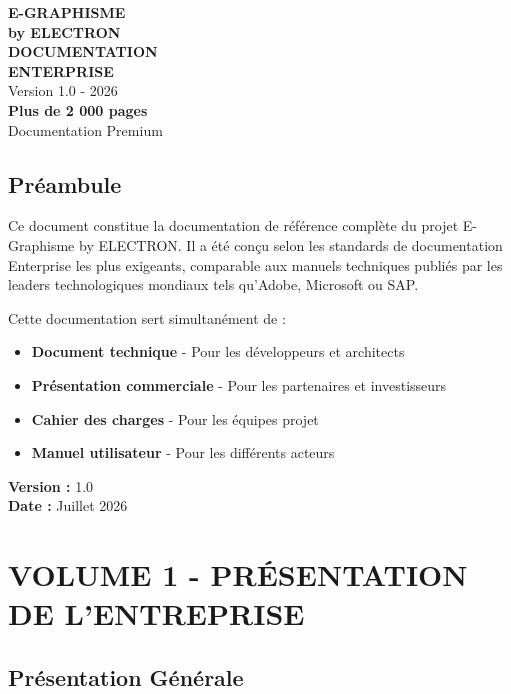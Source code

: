 \documentclass[12pt,a4paper,oneside]{book}
\begin{document}
\begin{titlepage}
\begin{center}
\vspace*{3cm}
{\Huge\bfseries\color{electronblue}E-GRAPHISME}\\[0.5cm]
{\LARGE\bfseries\color{electronpurple}by ELECTRON}\\[2cm]
{\Huge\bfseries\color{darkbg}DOCUMENTATION}\\[0.5cm]
{\Huge\bfseries\color{darkbg}ENTERPRISE}\\[3cm]
{\Large\color{electroncyan}Version 1.0 - 2026}\\[1cm]
\vfill
{\Large\bfseries\color{electrongold}Plus de 2 000 pages}\\[0.5cm]
{\Large Documentation Premium}
\end{center}
\end{titlepage}

\frontmatter
\chapter*{Préambule}
Ce document constitue la documentation de référence complète du projet E-Graphisme by ELECTRON. Il a été conçu selon les standards de documentation Enterprise les plus exigeants, comparable aux manuels techniques publiés par les leaders technologiques mondiaux tels qu'Adobe, Microsoft ou SAP.

Cette documentation sert simultanément de :
\begin{itemize}
\item \textbf{Document technique} - Pour les développeurs et architects
\item \textbf{Présentation commerciale} - Pour les partenaires et investisseurs  
\item \textbf{Cahier des charges} - Pour les équipes projet
\item \textbf{Manuel utilisateur} - Pour les différents acteurs
\end{itemize}

\bigskip
\textbf{Version :} 1.0\\
\textbf{Date :} Juillet 2026

\tableofcontents

\mainmatter

\part{VOLUME 1 - PRÉSENTATION DE L'ENTREPRISE}

\chapter{Présentation Générale}
\end{document}
